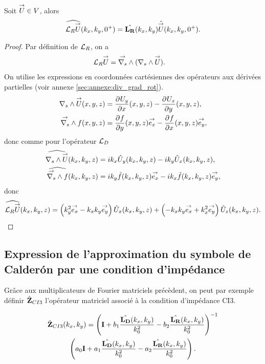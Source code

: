     \begin{prop}
      Soit \(\vect{U} \in V\), alors
      \begin{equation*}
        \widehat{\LR \vect{U}} (k_x,k_y,0^+) = \hat{\mLR}(k_x,k_y) \hat{\vect{U}}(k_x,k_y,0^+).
      \end{equation*}
    \end{prop}

    \begin{proof}
      Par définition de \(\LR\), on a
      \begin{align*}
        \LR \vect{U} & = \vrots{} (\rots{} \vect{U}).
      \end{align*}
      On utilise les expressions en coordonnées cartésiennes des opérateurs aux dérivées partielles (voir annexe \ref{sec:annexe:div_grad_rot}).
      \begin{align*}
        \rots{\vect{U}}(x,y,z) &= \ddr{x}{U_y}(x,y,z) - \ddr{y}{U_x}(x,y,z),
        \\
        \vrots{f}(x,y,z) &= \ddr{y}{f}(x,y,z)\vect{e_x} - \ddr{x}{f}(x,y,z)\vect{e_y},
      \end{align*}
      donc comme pour l'opérateur \(\LD\)
      \begin{align*}
        \widehat{\rots{\vect{U}}}(k_x,k_y,z) &= ik_x{\hat{U}_y}(k_x,k_y,z) - ik_y{\hat{U}_x}(k_x,k_y,z),
        \\
        \widehat{\vrots{f}}(k_x,k_y,z) &=  ik_y\hat{f}(k_x,k_y,z)\vect{e_x} - ik_x\hat{f}(k_x,k_y,z)\vect{e_y},
      \end{align*}
      donc
      \begin{align*}
        \widehat{\LR{\vect{U}}}(k_x,k_y,z) =  \left({k_y^2}\vect{e_x} -k_xk_y\vect{e_y}\right){\hat{U}_x}(k_x,k_y,z) + \left(-k_xk_y\vect{e_x} + k_x^2\vect{e_y}\right){\hat{U}_z}(k_x,k_y,z).
      \end{align*}
    \end{proof}

  \subsection{Expression de l'approximation du symbole de Calderón par une condition d'impédance}
    Grâce aux multiplicateurs de Fourier matriciels précèdent, on peut par exemple définir \(\hat{\mZ}_{CI3}\) l’opérateur matriciel associé à la condition d'impédance CI3.

    \begin{multline}
      \label{eq:plan:hoibc:ci3}
      \hat{\mZ}_{CI3}(k_x,k_y) = \left(\mI + b_1 \frac{\hat{\mLD}(k_x,k_y)}{k_0^2} - b_2 \frac{\hat{\mLR}(k_x,k_y)}{k_0^2} \right)^{-1}\\\left(a_0 \mI + a_1 \frac{\hat{\mLD}(k_x,k_y)}{k_0^2} - a_2 \frac{\hat{\mLR}(k_x,k_y)}{k_0^2}\right).
    \end{multline}

